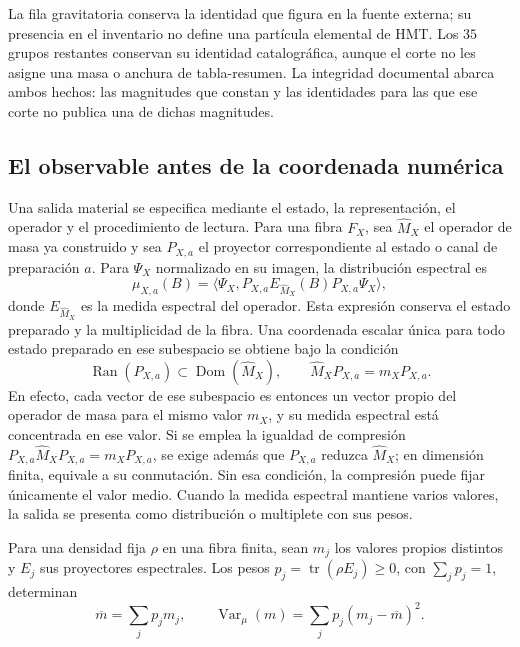 La fila gravitatoria conserva la identidad que figura en la fuente externa;
su presencia en el inventario no define una partícula elemental de HMT.
Los \(35\) grupos restantes conservan su identidad catalográfica, aunque
el corte no les asigne una masa o anchura de tabla-resumen. La integridad
documental abarca ambos hechos: las magnitudes que constan y las identidades
para las que ese corte no publica una de dichas magnitudes.

\subsection{El observable antes de la coordenada numérica}
\label{subsec:vi-tipos-observable}

Una salida material se especifica mediante el estado, la representación,
el operador y el procedimiento de lectura. Para una fibra \(F_X\), sea
\(\widehat M_X\) el operador de masa ya construido y sea \(P_{X,a}\)
el proyector correspondiente al estado o canal de preparación \(a\).
Para \(\Psi_X\) normalizado en su imagen, la distribución espectral es
\[
 \mu_{X,a}(B)
 =\langle\Psi_X,
   P_{X,a}E_{\widehat M_X}(B)P_{X,a}\Psi_X\rangle,
\]
donde \(E_{\widehat M_X}\) es la medida espectral del operador. Esta
expresión conserva el estado preparado y la multiplicidad de la fibra.
Una coordenada escalar única para todo estado preparado en ese subespacio
se obtiene bajo la condición
\[
 \operatorname{Ran}(P_{X,a})\subset\operatorname{Dom}(\widehat M_X),
 \qquad \widehat M_XP_{X,a}=m_XP_{X,a}.
\]
En efecto, cada vector de ese subespacio es entonces un vector propio del
operador de masa para el mismo valor \(m_X\), y su medida espectral está
concentrada en ese valor. Si se emplea la igualdad de compresión
\(P_{X,a}\widehat M_XP_{X,a}=m_XP_{X,a}\), se exige además que
\(P_{X,a}\) reduzca \(\widehat M_X\); en dimensión finita, equivale
a su conmutación. Sin esa condición, la compresión puede fijar únicamente
el valor medio. Cuando la medida espectral mantiene varios valores, la
salida se presenta como distribución o multiplete con sus pesos.

Para una densidad fija \(\rho\) en una fibra finita, sean \(m_j\)
los valores propios distintos y \(E_j\) sus proyectores espectrales.
Los pesos \(p_j=\operatorname{tr}(\rho E_j)\geq0\), con
\(\sum_jp_j=1\), determinan
\[
 \overline m=\sum_jp_jm_j,\qquad
 \operatorname{Var}_{\mu}(m)=\sum_jp_j(m_j-\overline m)^2.
\]
